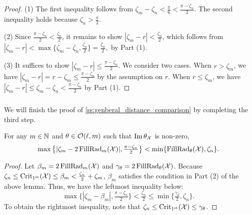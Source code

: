 \begin{proof}
    	(1) The first inequality follows from $\zeta_m - \zeta_n < \tfrac{\pi}{6} < \tfrac{\pi - \zeta_n}{2}$.
        The second inequality holds because $\zeta_n > \tfrac{\pi}{2}$.

        (2) Since $\tfrac{\pi - \zeta_n}{2} < \tfrac{\zeta_n}{2}$, it remains to show $|\zeta_m  - r | < \tfrac{\zeta_n}{2}$, which follows from
    	\(
    	|\zeta_m  - r | < \max\big\{\zeta_m - \zeta_n, \tfrac{\zeta_n}{2}\big\} = \tfrac{\zeta_n}{2},
    	\) by Part (1).

    	(3) %
        It suffices to show $|\zeta_m  - r | \leq \tfrac{\pi - \zeta_n}{2}$.
        We consider two cases.
        When $r > \zeta_m$, we have
    	$|\zeta_m  - r | = r - \zeta_m \leq
        \tfrac{\pi - \zeta_n}{2}
    	$ by the assumption on $r$.
    	When $r \leq \zeta_m$, we have
    	\(
    	|\zeta_m  - r | \leq \zeta_m - \zeta_n
    	< \tfrac{\pi - \zeta_n}{2}
    	\) by Part (1).
\end{proof}

\subsubsection{}
\label{sss:comparison_lemma_zeta_n}

We will finish the proof of \cref{ss:genberal_distance_comparison} by completing the third step.

\medskip \lemma
For any $m \in \mathbb{N}$ and $\theta \in \mathcal{O}(\ell, m)$ such that $\operatorname{Im} \theta_{\mathcal{X}}$ is non-zero,
\[\max\big\{|\zeta_m  - 2\operatorname{FillRad}_{m}(\mathcal{X}) |, \tfrac{\pi - \zeta_n}{2}\big\} < \min\{\operatorname{FillRad}_{\theta}(\mathcal{X}), \zeta_n\}.\]
\begin{proof}
    Let $\beta_m = 2\operatorname{FillRad}_{m}(\mathcal{X})$ and $\gamma_\theta = 2\operatorname{FillRad}_{\theta}(\mathcal{X})$.
    Because \(\zeta_n \leq \operatorname{Crit_{1^{\mathrm{st}}}}(\mathcal{X}) \leq \beta_m < \tfrac{\zeta_n}{2} + \zeta_m\), $\beta_m$ satisfies the condition in Part (2) of the above lemma.
    Thus, we have the leftmost inequality below:
    \[
    \max\big\{|\zeta_m - \beta_m|, \tfrac{\pi - \zeta_n}{2}\big\} < \tfrac{\zeta_n}{2}
    \leq
    \min\big\{\tfrac{\gamma_\theta}{2}, \zeta_n\big\}.
    \]
    To obtain the rightmost inequality, note that \(\zeta_n \leq \operatorname{Crit_{1^{\mathrm{st}}}}(\mathcal{X}) \leq \gamma_\theta\).
\end{proof}

